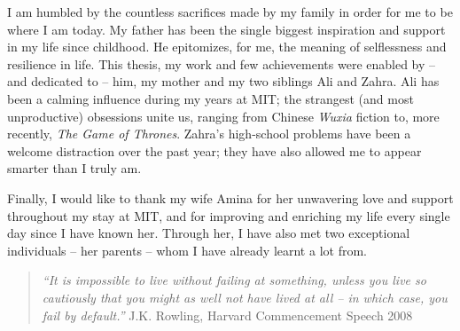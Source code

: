 I am humbled by the countless sacrifices made by my family in order for me to be where I am today. 
My father has been the single biggest inspiration and support in my life since childhood.
He epitomizes, for me, the meaning of selflessness and resilience in life. 
This thesis, my work and few achievements were enabled by -- and dedicated to -- him, my mother and my two siblings Ali 
and Zahra. Ali has been a calming influence during my years at MIT; the strangest
(and most unproductive) obsessions unite us, ranging from Chinese \emph{Wuxia} fiction to,
more recently, \emph{The Game of Thrones}. Zahra's high-school problems
have been a welcome distraction over the past year; they have also allowed me to appear
smarter than I truly am.

Finally, I would like to thank my wife Amina for her unwavering love and support throughout my stay at MIT, 
 and for improving and enriching my life every single day since I have known her. 
Through her, I have also met two exceptional individuals -- her parents --  whom I have already learnt a lot from.  \newline 

\begin{quote}
\emph{``It is impossible to live without failing at something, unless you live so cautiously that you might as well not have
lived at all -- in which case, you fail by default.''} \newline
J.K. Rowling, Harvard Commencement Speech 2008
\end{quote}

